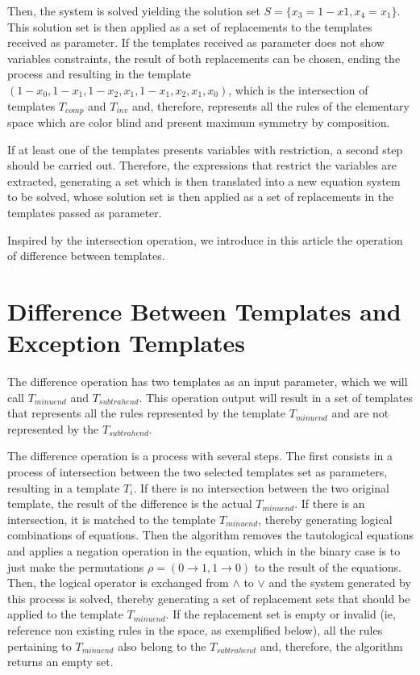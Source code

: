\documentclass{llncs}
\begin{document}
Then, the system is solved yielding the solution set $S = \{x_3 = 1-x1, x_4 = x_1\}$. This solution set is then applied as a set of replacements to the templates received as parameter. If the templates received as parameter does not show variables constraints, the result of both replacements can be chosen, ending the process and resulting in the template $(1 - x_0, 1 - x_1, 1 - x_2, x_1, 1 - x_1, x_2, x_1, x_0)$, which is the intersection of templates $T_{comp}$ and $T_{inv}$ and, therefore, represents all the rules of the elementary space which are color blind and present maximum symmetry by composition.

If at least one of the templates presents variables with restriction, a second step should be carried out. Therefore, the expressions that restrict the variables are extracted, generating a set which is then translated into a new equation system to be solved, whose solution set is then applied as a set of replacements in the templates passed as parameter.

Inspired by the intersection operation, we introduce in this article the operation of difference between templates.

\section{Difference Between Templates and Exception Templates}
\label{sec:diferenca_entre_templates_e_templates_de_excecao}

The difference operation has two templates as an input parameter, which we will call $T_{minuend}$ and $T_{subtrahend}$. This operation output will result in a set of templates that represents all the rules represented by the template $T_{minuend}$ and are not represented by the $T_{subtrahend}$.

The difference operation is a process with several steps. The first consists in a process of intersection between the two selected templates set as parameters, resulting in a template $T_i$. If there is no intersection between the two original template, the result of the difference is the actual $T_{minuend}$. If there is an intersection, it is matched to the template $T_{minuend}$, thereby generating logical combinations of equations. Then the algorithm removes the tautological equations and applies a negation operation in the equation, which in the binary case is to just make the permutations $\rho = (0 \to 1, 1 \to 0)$ to the result of the equations. Then, the logical operator is exchanged from $\wedge$ to $\vee$ and the system generated by this process is solved, thereby generating a set of replacement sets that should be applied to the template $T_{minuend}$. If the replacement set is empty or invalid (ie, reference non existing rules in the space, as exemplified below), all the rules pertaining to $T_{minuend}$ also belong to the $T_{subtrahend}$ and, therefore, the algorithm returns an empty set.
\end{document}
